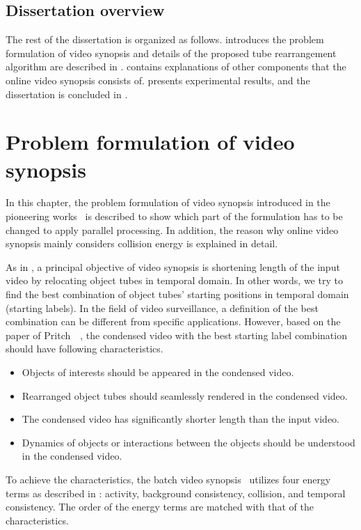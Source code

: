 \documentclass[11pt]{hyu_thesis}
\begin{document}
\section{Dissertation overview}
\label{sec:intro:overview}
The rest of the dissertation is organized as follows.  introduces the problem formulation of video synopsis and details of the proposed tube rearrangement algorithm are described in .  contains explanations of other components that the online video synopsis consists of.  presents experimental results, and the dissertation is concluded in .

\chapter{Problem formulation of video synopsis}
\label{sec:basic_form}

In this chapter, the problem formulation of video synopsis introduced in the pioneering works~\cite{Rav-Acha2006,Pritch2007,Pritch2008} is described to show which part of the formulation has to be changed to apply parallel processing. In addition, the reason why online video synopsis mainly considers collision energy is explained in detail.

As in , a principal objective of video synopsis is shortening length of the input video by relocating object tubes in temporal domain. In other words, we try to find the best combination of object tubes' starting positions in temporal domain (starting labels). In the field of video surveillance, a definition of the best combination can be different from specific applications. However, based on the paper of Pritch~\etal~\cite{Pritch2008}, the condensed video with the best starting label combination should have following characteristics.
\begin{itemize}
\item Objects of interests should be appeared in the condensed video.
\item Rearranged object tubes should seamlessly rendered in the condensed video.
\item The condensed video has significantly shorter length than the input video.
\item Dynamics of objects or interactions between the objects should be understood in the condensed video.
\end{itemize}
To achieve the characteristics, the batch video synopsis~\cite{Pritch2008} utilizes four energy terms as described in : activity, background consistency, collision, and temporal consistency. The order of the energy terms are matched with that of the characteristics.
\end{document}
